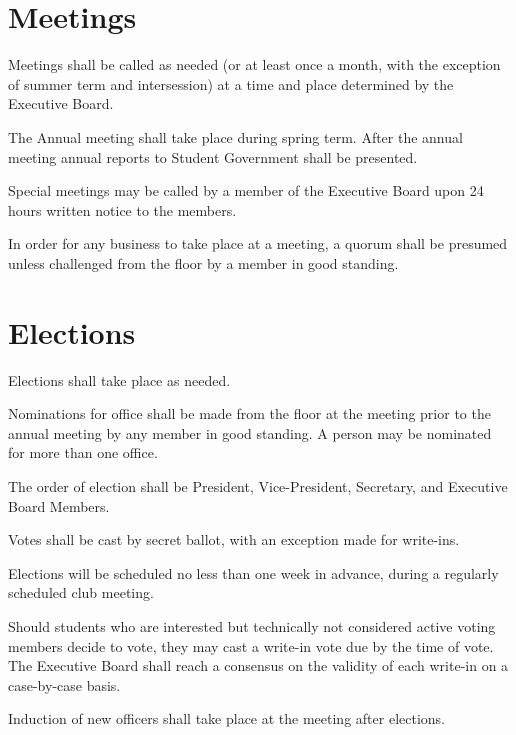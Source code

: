\section{Meetings}
\begin{subroutines}
\item Meetings shall be called as needed (or at least once a month, with the exception of summer term and intersession) at a time and place determined by the Executive Board.
\item The Annual meeting shall take place during spring term. After the annual meeting annual reports to Student Government shall be presented.
\item Special meetings may be called by a member of the Executive Board upon 24 hours written notice to the members.
\item In order for any business to take place at a meeting, a quorum shall be presumed unless challenged from the floor by a member in good standing.
\end{subroutines}

\section{Elections}
\begin{subroutines}
\item Elections shall take place as needed.
\item Nominations for office shall be made from the floor at the meeting prior to the annual meeting by any member in good standing. A person may be nominated for more than one office.
\item The order of election shall be President, Vice-President, Secretary, and Executive Board Members.
\item Votes shall be cast by secret ballot, with an exception made for write-ins.
\item Elections will be scheduled no less than one week in advance, during a regularly scheduled club meeting.
\item Should students who are interested but technically not considered active voting members decide to vote, they may cast a write-in vote due by the time of vote. The Executive Board shall reach a consensus on the validity of each write-in on a case-by-case basis.
\item Induction of new officers shall take place at the meeting after elections.
\end{subroutines}

